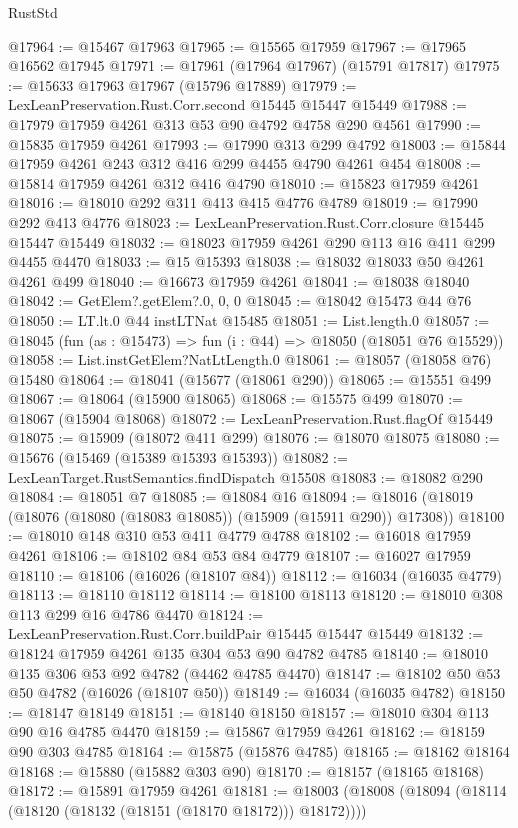 \begin{lexlean}{RustStd}
\begin{coremodule}
@17964 := @15467 @17963
@17965 := @15565 @17959
@17967 := @17965 @16562 @17945
@17971 := @17961 (@17964 @17967) (@15791 @17817)
@17975 := @15633 @17963 @17967 (@15796 @17889)
@17979 := LexLeanPreservation.Rust.Corr.second @15445 @15447 @15449
@17988 := @17979 @17959 @4261 @313 @53 @90 @4792 @4758 @290 @4561
@17990 := @15835 @17959 @4261
@17993 := @17990 @313 @299 @4792
@18003 := @15844 @17959 @4261 @243 @312 @416 @299 @4455 @4790 @4261 @454
@18008 := @15814 @17959 @4261 @312 @416 @4790
@18010 := @15823 @17959 @4261
@18016 := @18010 @292 @311 @413 @415 @4776 @4789
@18019 := @17990 @292 @413 @4776
@18023 := LexLeanPreservation.Rust.Corr.closure @15445 @15447 @15449
@18032 := @18023 @17959 @4261 @290 @113 @16 @411 @299 @4455 @4470
@18033 := @15 @15393
@18038 := @18032 @18033 @50 @4261 @4261 @499
@18040 := @16673 @17959 @4261
@18041 := @18038 @18040
@18042 := GetElem?.getElem?.{0, 0, 0}
@18045 := @18042 @15473 @44 @76
@18050 := LT.lt.{0} @44 instLTNat @15485
@18051 := List.length.{0}
@18057 := @18045 (fun (as : @15473) => fun (i : @44) => @18050 (@18051 @76 @15529))
@18058 := List.instGetElem?NatLtLength.{0}
@18061 := @18057 (@18058 @76) @15480
@18064 := @18041 (@15677 (@18061 @290))
@18065 := @15551 @499
@18067 := @18064 (@15900 @18065)
@18068 := @15575 @499
@18070 := @18067 (@15904 @18068)
@18072 := LexLeanPreservation.Rust.flagOf @15449
@18075 := @15909 (@18072 @411 @299)
@18076 := @18070 @18075
@18080 := @15676 (@15469 (@15389 @15393 @15393))
@18082 := LexLeanTarget.RustSemantics.findDispatch @15508
@18083 := @18082 @290
@18084 := @18051 @7
@18085 := @18084 @16
@18094 := @18016 (@18019 (@18076 (@18080 (@18083 @18085)) (@15909 (@15911 @290)) @17308))
@18100 := @18010 @148 @310 @53 @411 @4779 @4788
@18102 := @16018 @17959 @4261
@18106 := @18102 @84 @53 @84 @4779
@18107 := @16027 @17959
@18110 := @18106 (@16026 (@18107 @84))
@18112 := @16034 (@16035 @4779)
@18113 := @18110 @18112
@18114 := @18100 @18113
@18120 := @18010 @308 @113 @299 @16 @4786 @4470
@18124 := LexLeanPreservation.Rust.Corr.buildPair @15445 @15447 @15449
@18132 := @18124 @17959 @4261 @135 @304 @53 @90 @4782 @4785
@18140 := @18010 @135 @306 @53 @92 @4782 (@4462 @4785 @4470)
@18147 := @18102 @50 @53 @50 @4782 (@16026 (@18107 @50))
@18149 := @16034 (@16035 @4782)
@18150 := @18147 @18149
@18151 := @18140 @18150
@18157 := @18010 @304 @113 @90 @16 @4785 @4470
@18159 := @15867 @17959 @4261
@18162 := @18159 @90 @303 @4785
@18164 := @15875 (@15876 @4785)
@18165 := @18162 @18164
@18168 := @15880 (@15882 @303 @90)
@18170 := @18157 (@18165 @18168)
@18172 := @15891 @17959 @4261
@18181 := @18003 (@18008 (@18094 (@18114 (@18120 (@18132 (@18151 (@18170 @18172))) @18172))))

\end{coremodule}
\end{lexlean}
